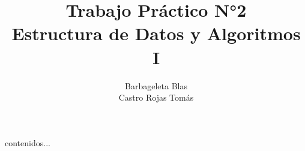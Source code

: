 \documentclass{article}
\title{Trabajo Práctico N°2 \\ \large Estructura de Datos y Algoritmos I}
\author{Barbageleta Blas \\ Castro Rojas Tomás}
\begin{document}
	\maketitle
	contenidos...
\end{document}
